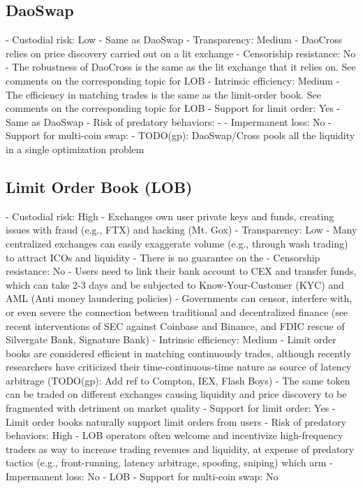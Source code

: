\documentclass[11pt, reqno]{amsart}
\begin{document}
\subsection{DaoSwap}

- Custodial risk: Low
    - Same as DaoSwap
- Transparency: Medium
    - DaoCross relies on price discovery carried out on a lit exchange
- Censoriship resistance: No
    - The robustness of DaoCross is the same as the lit exchange that it relies on. See comments on the corresponding topic for LOB
- Intrinsic efficiency: Medium
    - The efficiency in matching trades is the same as the limit-order book. See comments on the corresponding topic for LOB
- Support for limit order: Yes
    - Same as DaoSwap
- Risk of predatory behaviors:
    -
- Impermanent loss: No
- Support for multi-coin swap:
	- TODO(gp): DaoSwap/Cross pools all the liquidity in a single optimization problem

\subsection{Limit Order Book (LOB)}

- Custodial risk: High
    - Exchanges own user private keys and funds, creating issues with fraud (e.g., FTX) and hacking (Mt. Gox)
- Transparency: Low
    - Many centralized exchanges can easily exaggerate volume (e.g., through wash trading) to attract ICOs and liquidity
    - There is no guarantee on the
- Censorship resistance: No
    - Users need to link their bank account to CEX and transfer funds, which can take 2-3 days and be subjected to Know-Your-Customer (KYC) and AML (Anti money laundering policies)
    - Governments can censor, interfere with, or even severe the connection between traditional and decentralized finance (see recent interventions of SEC against Coinbase and Binance, and FDIC rescue of Silvergate Bank, Signature Bank)
- Intrinsic efficiency: Medium
    - Limit order books are considered efficient in matching continuously trades, although recently researchers have criticized their time-continuous-time nature as source of latency arbitrage (TODO(gp): Add ref to Compton, IEX, Flash Boys)
    - The same token can be traded on different exchanges causing liquidity and price discovery to be fragmented with detriment on market quality
- Support for limit order: Yes
    - Limit order books naturally support limit orders from users
- Risk of predatory behaviors: High
	- LOB operators often welcome and incentivize high-frequency traders as way
to increase trading revenues and liquidity, at expense of predatory tactics
(e.g., front-running, latency arbitrage, spoofing, sniping) which arm
- Impermanent loss: No
    - LOB
- Support for multi-coin swap: No
\end{document}
